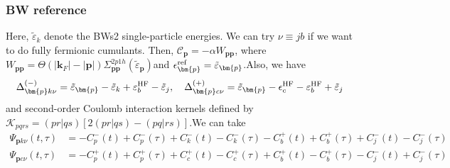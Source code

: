 \begin{frame}
    \frametitle{BW reference}
Here, $\tilde{\varepsilon}_{{k}}$ denote the BWs2 single-particle energies. \pause We can try $\nu\equiv jb$ if we want to do fully fermionic cumulants. \pause Then, $\mathcal{C}_{\bm{p}}=-\alpha W_{\bm{p}\bm{p}}$, where $W_{\bm{p}\bm{p}}=\Theta(|\bm{k}_F| - |\bm{p}|)\Sigma^{2p1h}_{\bm{p}\bm{p}}(\tilde{\varepsilon}_{\bm{p}})$\pause and $\epsilon_{\bm{p}}^{\rm ref}=\tilde{\varepsilon}_{\bm{p}}$.\pause Also,
we have
\begin{align}
\Delta_{\bm{p}k\nu}^{(-)}
&=
\tilde{\varepsilon}_{\bm{p}}
-\tilde{\varepsilon}_k
+{\varepsilon_b^{\rm HF}} - \tilde{\varepsilon}_j, \quad \Delta_{\bm{p}c\nu}^{(+)}
=
\tilde{\varepsilon}_{\bm{p}}
-\epsilon_c^{\rm HF}
-{\varepsilon_b^{\rm HF}} + \tilde{\varepsilon}_j
\end{align} \pause
and second-order Coulomb interaction kernels defined by $\mathcal K_{pqrs}=
(pr|qs)
\left[
2(pr|qs)-(pq|rs)
\right]$.\pause We can take 
\begin{align}
\Psi_{\bm{p}k\nu}(t,\tau)
&=
-C_p^{-}(t)
+C_p^{-}(\tau)
+C_k^{-}(t)
-C_k^{-}(\tau) - C_b^{+}(t) + C_b^{+}(\tau) + C_j^{-}(t) - C_j^{-}(\tau) \\
\Psi_{\bm{p}c\nu}(t,\tau)
&=
-C_p^{+}(t)
+C_p^{+}(\tau)
+C_c^{+}(t)
-C_c^{+}(\tau) + C_b^{+}(t) - C_b^{+}(\tau) - C_j^{-}(t) + C_j^{-}(\tau)
\end{align}
\end{frame}